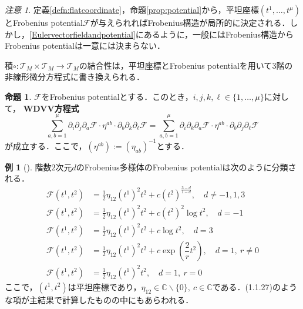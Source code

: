 \documentclass[a4paper,11pt]{jbook}
\theoremstyle{plain}
\theoremstyle{definition}
\newtheorem{prop}[thm]{命題}
\newtheorem{exmp}[thm]{例}
\theoremstyle{remark}
\newtheorem{rem}[thm]{注意}
\theoremstyle{proof}
\numberwithin{equation}{section}
\def\CC{{\mathbb C}}
\def\F{{\mathcal F}}
\def\T{{\mathcal T}}
\def\p{{\partial }}
\def\p{\partial }
\begin{document}
\begin{rem}
定義\ref{defn:flatcoordinate}，命題\ref{prop:potential}から，平坦座標$(t^{1},\dots,t^{\mu})$とFrobenius potential$\F$が与えられればFrobenius構造が局所的に決定される．しかし，\eqref{Eulervectorfieldandpotential}にあるように，一般にはFrobenius構造からFrobenius potentialは一意には決まらない．
\end{rem}

積$\circ:\T_{M}\times\T_{M}\to\T_{M}$の結合性は，平坦座標とFrobenius potentialを用いて$3$階の非線形微分方程式に書き換えられる．

\begin{prop}
$\F$をFrobenius potentialとする．このとき，$i,j,k,\ell \in \{1,\dots, \mu \}$に対して，
{\bf WDVV方程式}
\begin{equation}
\displaystyle \sum_{a ,b=1}^{\mu}\p_{i}\p_{j}\p_{a}\F \cdot \eta^{a b}\cdot \p_{b}\p_{k}\p_{\ell}\F
=\sum_{a ,b=1}^{\mu}\p_{i}\p_{k}\p_{a}\F \cdot \eta^{a b}\cdot \p_{b}\p_{j}\p_{\ell}\F
\end{equation}
が成立する．ここで，$(\eta^{ab}):=(\eta_{ab})^{-1}$とする．
\end{prop}

\begin{exmp}[{\cite[Example 1.1]{d:1}}]
\label{classificationofFrobmfdofrank2}
階数$2$次元$d$のFrobenius多様体のFrobenius potentialは次のように分類される．
\begin{align}
\label{Frobeniuspotentialofgeneraltype} \F(t^1,t^2)&= \frac{1}{2}\eta_{12}(t^1)^2t^2+c(t^2)^{\frac{3-d}{1-d}},\quad d\not= -1,1,3  \\
\F(t^1,t^2)&= \frac{1}{2}\eta_{12}(t^1)^2t^2+c(t^2)^2 \log t^2,\quad d=-1  \\
\F(t^1,t^2)&= \frac{1}{2}\eta_{12}(t^1)^2t^2+c\log t^2 ,\quad d=3 \\
\F(t^1,t^2)&= \frac{1}{2}\eta_{12}(t^1)^2t^2+c\exp \left( \dfrac{2}{r}t^2\right) ,\quad d=1 ,~r\not= 0  \\
\F(t^1,t^2)&= \frac{1}{2}\eta_{12}(t^1)^2t^2,\quad d=1,~r=0
\end{align}
ここで，$(t^1,t^2)$は平坦座標であり，$\eta_{12}\in\CC\backslash\{ 0 \}, ~ c\in\CC$である．(1.1.27)のような項が主結果で計算したものの中にもあらわれる．
\end{exmp}

\end{document}
